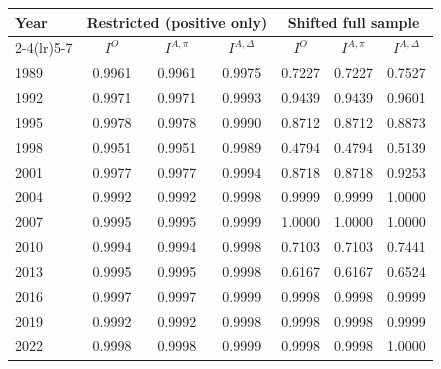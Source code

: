 \begin{tabular}{lcccccc}
\toprule
Year & \multicolumn{3}{c}{Restricted (positive only)} & \multicolumn{3}{c}{Shifted full sample} \\
\cmidrule(lr){2-4}\cmidrule(lr){5-7}
& $I^{O}$ & $I^{A,\pi}$ & $I^{A,\Delta}$ & $I^{O}$ & $I^{A,\pi}$ & $I^{A,\Delta}$ \\
\midrule
1989 & 0.9961 & 0.9961 & 0.9975 & 0.7227 & 0.7227 & 0.7527 \\
1992 & 0.9971 & 0.9971 & 0.9993 & 0.9439 & 0.9439 & 0.9601 \\
1995 & 0.9978 & 0.9978 & 0.9990 & 0.8712 & 0.8712 & 0.8873 \\
1998 & 0.9951 & 0.9951 & 0.9989 & 0.4794 & 0.4794 & 0.5139 \\
2001 & 0.9977 & 0.9977 & 0.9994 & 0.8718 & 0.8718 & 0.9253 \\
2004 & 0.9992 & 0.9992 & 0.9998 & 0.9999 & 0.9999 & 1.0000 \\
2007 & 0.9995 & 0.9995 & 0.9999 & 1.0000 & 1.0000 & 1.0000 \\
2010 & 0.9994 & 0.9994 & 0.9998 & 0.7103 & 0.7103 & 0.7441 \\
2013 & 0.9995 & 0.9995 & 0.9998 & 0.6167 & 0.6167 & 0.6524 \\
2016 & 0.9997 & 0.9997 & 0.9999 & 0.9998 & 0.9998 & 0.9999 \\
2019 & 0.9992 & 0.9992 & 0.9998 & 0.9998 & 0.9998 & 0.9999 \\
2022 & 0.9998 & 0.9998 & 0.9999 & 0.9998 & 0.9998 & 1.0000 \\
\bottomrule
\end{tabular}


